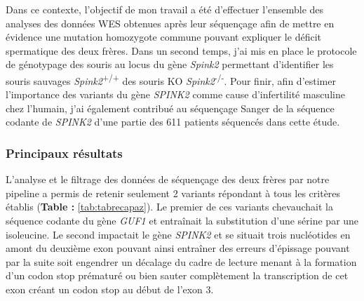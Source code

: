 \documentclass[12pt,a4paper,twoside]{ugathesis}
\theoremstyle{definition}
\theoremstyle{definition}
\theoremstyle{definition}
\theoremstyle{remark}
\begin{document}
Dans ce contexte, l'objectif de mon travail a été d'effectuer l'ensemble
des analyses des données WES obtenues après leur séquençage afin de
mettre en évidence une mutation homozygote commune pouvant expliquer le
déficit spermatique des deux frères. Dans un second temps, j'ai mis en
place le protocole de génotypage des souris au locus du gène
\emph{Spink2} permettant d'identifier les souris sauvages
\emph{Spink2}\textsuperscript{+/+} des souris KO
\emph{Spink2}\textsuperscript{-/-}. Pour finir, afin d'estimer
l'importance des variants du gène \emph{SPINK2} comme cause
d'infertilité masculine chez l'humain, j'ai également contribué au
séquençage Sanger de la séquence codante de \emph{SPINK2} d'une partie
des 611 patients séquencés dans cette étude.

\newpage



\newpage

\subsubsection{Principaux résultats}\label{principaux-resultats}

L'analyse et le filtrage des données de séquençage des deux frères par
notre pipeline a permis de retenir seulement 2 variants répondant à tous
les critères établis (\textbf{Table : }\ref{tab:tabrecapaz}). Le premier
de ces variants chevauchait la séquence codante du gène \emph{GUF1} et
entraînait la substitution d'une sérine par une isoleucine. Le second
impactait le gène \emph{SPINK2} et se situait trois nucléotides en amont
du deuxième exon pouvant ainsi entraîner des erreurs d'épissage pouvant
par la suite soit engendrer un décalage du cadre de lecture menant à la
formation d'un codon stop prématuré ou bien sauter complètement la
transcription de cet exon créant un codon stop au début de l'exon 3.
\end{document}
